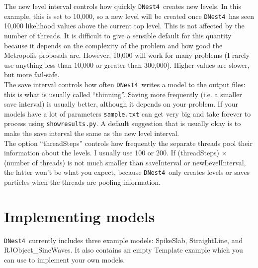 \documentclass[a4paper, 11pt]{article}
\newcommand{\dnest}{{\tt DNest4}}
\begin{document}
The new level interval controls how quickly \dnest~creates new levels. In this
example, this is set to 10,000, so a new level will be created once \dnest~has
seen 10,000 likelihood values above the current top level. This is not affected by
the number of threads. It is difficult to give a sensible default for this
quantity because it depends on the complexity of the problem and how good
the Metropolis proposals are. However, 10,000
will work for many problems (I rarely use anything less than 10,000 or greater
than 300,000). Higher values are slower, but more fail-safe.\\

The save interval controls how often \dnest~writes a model to the output
files: this is what is usually called ``thinning''. Saving more frequently
(i.e. a smaller save interval) is usually better, although it depends on your
problem. If your models have a lot of parameters {\tt sample.txt} can get
very big and take forever to process using {\tt showresults.py}. A default
suggestion that is usually okay is to make the save interval the same as the
new level interval.\\

The option ``threadSteps'' controls how frequently the separate threads pool
their information about the levels. I usually use 100 or 200. If
(threadSteps) $\times$ (number of threads) is not much smaller than
saveInterval or newLevelInterval, the latter won't be what you expect, because
\dnest~only creates levels or saves particles when the threads are pooling
information.\\

\section{Implementing models}
\dnest~currently includes three example models: SpikeSlab, StraightLine, and
RJObject_SineWaves. It also contains an empty Template example which you can use
to implement your own models.\\
\end{document}
